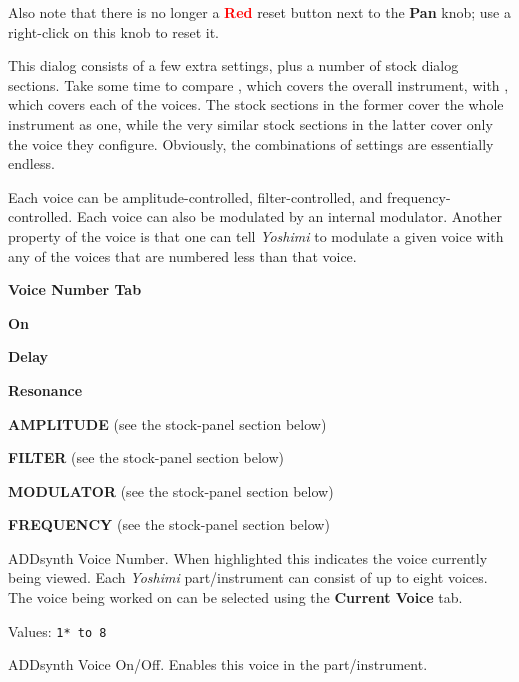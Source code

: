    Also note that there is no longer a \textbf{\textcolor{red}{Red}}
   reset button next to the \textbf{Pan} knob;
   use a right-click on this knob to reset it.

   This dialog consists of a few extra settings, plus a number of
   stock dialog sections.  Take some time to compare
   ,
   which covers the overall instrument, with
   ,
   which covers each of the voices.
   The stock sections in the former cover the whole instrument as one,
   while the very similar stock sections in the latter cover only the
   voice they configure.
   Obviously, the combinations of settings are essentially endless.

   Each voice can be amplitude-controlled, filter-controlled, and
   frequency-controlled.  Each voice can also be modulated by an
   internal modulator.
   Another property of the voice is that one can tell \textsl{Yoshimi}
   to modulate a given voice with any of the voices that are numbered less
   than that voice.

   \begin{enumber}
      \item \textbf{Voice Number Tab}
      \item \textbf{On}
      \item \textbf{Delay}
      \item \textbf{Resonance}
      \item \textbf{AMPLITUDE} (see the stock-panel section below)
      \item \textbf{FILTER} (see the stock-panel section below)
      \item \textbf{MODULATOR} (see the stock-panel section below)
      \item \textbf{FREQUENCY} (see the stock-panel section below)
   \end{enumber}

   \setcounter{ItemCounter}{0}      %

   ADDsynth Voice Number.
   When highlighted this indicates the voice currently being viewed.  Each
   \textsl{Yoshimi} part/instrument can consist of up to eight voices. The
   voice being worked on can be selected using the \textbf{Current Voice} tab.

   Values: \texttt{1* to 8}

   ADDsynth Voice On/Off.
   Enables this voice in the part/instrument.

